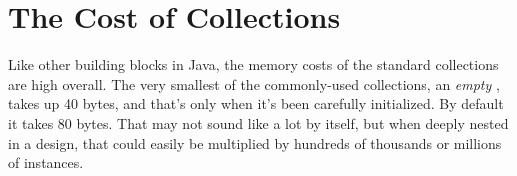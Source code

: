 \begin{description}

\end{description}


\section{The Cost of Collections}
\label{sec:designing-with-collections}

Like other building blocks in Java, the memory costs
of the standard collections are high overall. 
The very smallest of the commonly-used collections, an \emph{empty}
, takes up 40 bytes, and that's only when it's been carefully
initialized. By default it takes 80 bytes. That may not sound like a lot by
itself, but when deeply nested in a design, that could easily be multiplied
by hundreds of thousands or millions of instances.  





